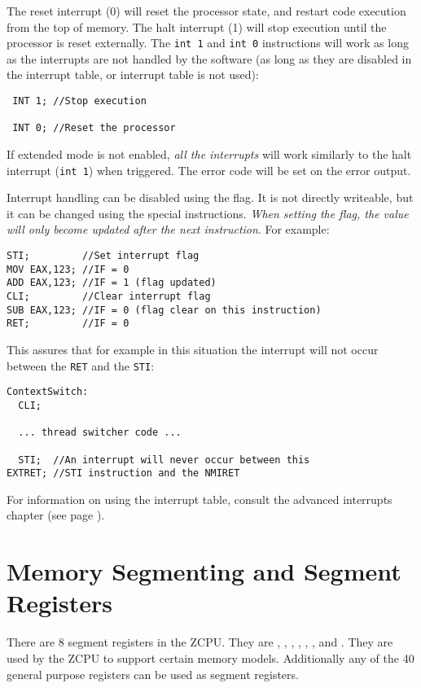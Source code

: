 The reset interrupt (0) will reset the processor state, and restart code execution from the top of memory. The halt interrupt (1) will stop execution until the processor is reset externally. The \texttt{int 1} and \texttt{int 0} instructions will work as long as the interrupts are not handled by the software (as long as they are disabled in the interrupt table, or interrupt table is not used):
\begin{verbatim}
 INT 1; //Stop execution
 
 INT 0; //Reset the processor
\end{verbatim}

If extended mode is not enabled, \emph{all the interrupts} will work similarly to the halt interrupt (\texttt{int 1}) when triggered. The error code will be set on the error output.

Interrupt handling can be disabled using the  flag. It is not directly writeable, but it can be changed using the special instructions. \emph{When setting the flag, the value will only become updated after the next instruction}. For example:

\begin{verbatim}
STI;         //Set interrupt flag
MOV EAX,123; //IF = 0
ADD EAX,123; //IF = 1 (flag updated)
CLI;         //Clear interrupt flag
SUB EAX,123; //IF = 0 (flag clear on this instruction)
RET;         //IF = 0 
\end{verbatim}

This assures that for example in this situation the interrupt will not occur between the \texttt{RET} and the \texttt{STI}:

\begin{verbatim}
ContextSwitch:
  CLI;
  
  ... thread switcher code ...
  
  STI;  //An interrupt will never occur between this
EXTRET; //STI instruction and the NMIRET
\end{verbatim}

For information on using the interrupt table, consult the advanced interrupts chapter (see page \pageref{advancedinterrupts}).

\section{Memory Segmenting and Segment Registers} \label{segments}
There are 8 segment registers in the ZCPU. They are , , , , , ,  and . They are used by the ZCPU to support certain memory models. Additionally any of the 40 general purpose registers can be used as segment registers.

